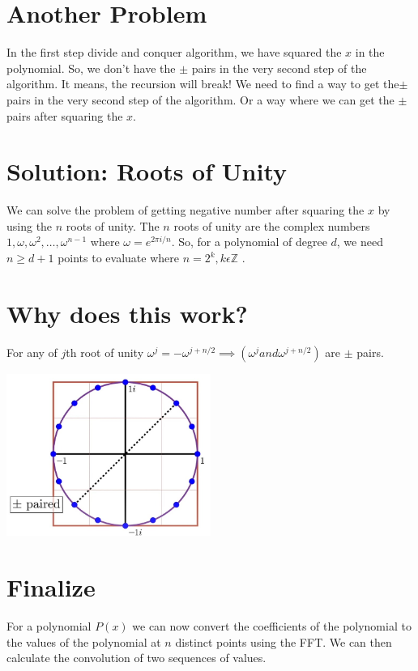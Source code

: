 \documentclass{report}
\begin{document}
\section{Another Problem}
In the first step divide and conquer algorithm, we have squared the $x$ in the polynomial. So, we don't have the $\pm$ pairs in the very second step of the algorithm. It means, the recursion will break! We need to find a way to get the$ \pm $ pairs in the very second step of the algorithm. Or a way where we can get the $\pm $pairs after squaring the \(x\).

\section{Solution: Roots of Unity}
We can solve the problem of getting negative number after squaring the \(x\) by using the \(n\) roots of unity. The \(n\) roots of unity are the complex numbers \(1, \omega, \omega^2, \ldots, \omega^{n-1}\) where \(\omega = e^{2\pi i/n}\). 
So, for a polynomial of degree \(d\), we need \(n \geq d + 1\) points to evaluate where $n = 2^k , k \epsilon   \mathbb{Z} $ .



\section{Why does this work?}
For any of $j$th root of unity $\omega^j = - \omega^{j + n/2} \implies (\omega^j and \omega^{j + n/2})$ are $\pm$ pairs.


	\includegraphics[width=0.5\textwidth]{rootsOfUnity.jpg}
 
\section{Finalize}
For a polynomial $P(x)$ we can now convert the coefficients of the polynomial to the values of the polynomial at \(n\) distinct points using the FFT. We can then calculate the convolution of two sequences of values. 
\end{document}
